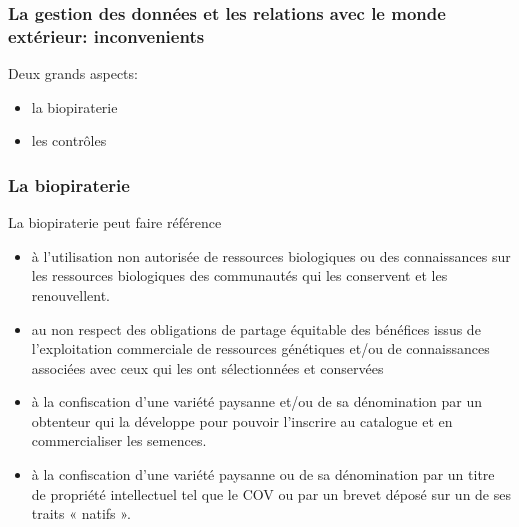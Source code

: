 \begin{frame}
\frametitle{La gestion des données et les relations avec le monde extérieur: inconvenients}

Deux grands aspects:
\begin{itemize}
\item la biopiraterie
\item les contrôles
\end{itemize}

\end{frame}

\begin{frame}
\frametitle{La biopiraterie}

La biopiraterie peut faire référence
\begin{itemize}
\item à l'utilisation non autorisée de ressources biologiques ou des connaissances sur les ressources biologiques des communautés qui les conservent et les renouvellent.
\item au non respect des obligations de partage équitable des bénéfices issus de l'exploitation
commerciale de ressources génétiques et/ou de connaissances associées avec ceux qui les
ont sélectionnées et conservées
\item à la confiscation d'une variété paysanne et/ou de sa dénomination par un obtenteur qui la
développe pour pouvoir l'inscrire au catalogue et en commercialiser les semences. 
\item à la confiscation d'une variété paysanne ou de sa dénomination par un titre de propriété
intellectuel tel que le COV ou par un brevet déposé sur un de ses traits « natifs ».
\end{itemize}

\end{frame}




